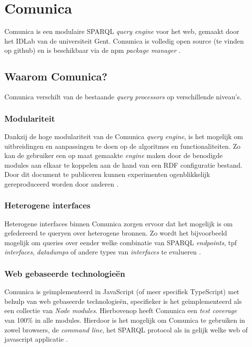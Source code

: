 \section{Comunica}
\label{sec:comunica}

Comunica is een modulaire SPARQL \textit{query engine} voor het web, gemaakt door het IDLab van de universiteit Gent. Comunica is volledig open source (te vinden op github) en is beschikbaar via de npm \textit{package manager} \cite{taelman2018comunica}.

\subsection{Waarom Comunica?}
Comunica verschilt van de bestaande \textit{query processors} op verschillende niveau's. 

\subsubsection{Modulariteit}
Dankzij de hoge modulariteit van de Comunica \textit{query engine}, is het mogelijk om uitbreidingen en aanpassingen te doen op de algoritmes en functionaliteiten. Zo kan de gebruiker een op maat gemaakte \textit{engine} maken door de benodigde modules aan elkaar te koppelen aan de hand van een RDF configuratie bestand. Door dit document te publiceren kunnen experimenten ogenblikkelijk gereproduceerd worden door anderen \cite{taelman2018comunica}.

\subsubsection{Heterogene interfaces}
Heterogene interfaces binnen Comunica zorgen ervoor dat het mogelijk is om gefedereerd te queryen over heterogene bronnen. Zo wordt het bijvoorbeeld mogelijk om queries over eender welke combinatie van SPARQL \textit{endpoints}, \acrshort{tpf} \textit{interfaces}, \textit{datadumps} of andere types van \textit{interfaces} te evalueren \cite{taelman2018comunica}.

\subsubsection{Web gebaseerde technologieën}
Comunica is geïmplementeerd in JavaScript (of meer specifiek TypeScript) met behulp van web gebaseerde technologieën, specifieker is het geïmplementeerd als een collectie van \textit{Node modules}. Hierbovenop heeft Comunica een \textit{test coverage} van 100\% in alle modules. Hierdoor is het mogelijk om Comunica te gebruiken in zowel browsers, de \textit{command line}, het SPARQL protocol als in gelijk welke web of javascript applicatie \cite{taelman2018comunica}.



